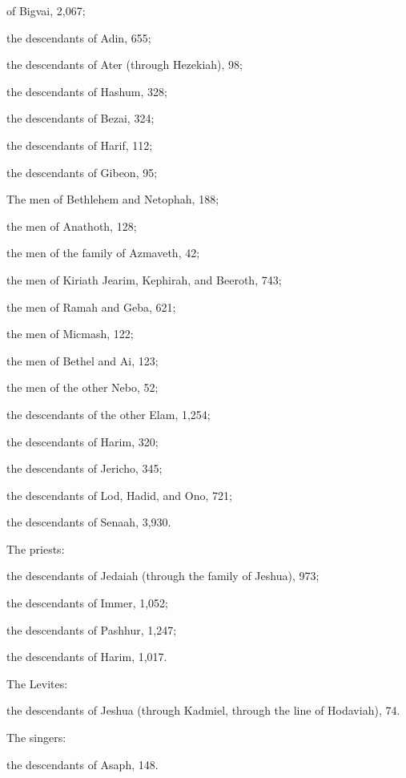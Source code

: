 {of Bigvai,
2,067;
\par }{\PP {}the descendants
of Adin,
655;
\par }{\PP {}the descendants
of Ater
(through Hezekiah), 98;
\par }{\PP {}the descendants
of Hashum,
328;
\par }{\PP {}the descendants
of Bezai,
324;
\par }{\PP {}the descendants
of Harif,
112;
\par }{\PP {}the descendants
of Gibeon,
95;
\par }{\PP {}The men
of Bethlehem
and Netophah,
188;
\par }{\PP {}the men
of Anathoth,
128;
\par }{\PP {}the men
of the family of Azmaveth,
42;
\par }{\PP {}the men
of Kiriath Jearim,
Kephirah,
and Beeroth,
743;
\par }{\PP {}the men
of Ramah
and Geba,
621;
\par }{\PP {}the men
of Micmash,
122;
\par }{\PP {}the men
of Bethel
and Ai,
123;
\par }{\PP {}the men
of the other
Nebo,
52;
\par }{\PP {}the descendants
of the other
Elam,
1,254;
\par }{\PP {}the descendants
of Harim,
320;
\par }{\PP {}the descendants
of Jericho,
345;
\par }{\PP {}the descendants
of Lod,
Hadid,
and Ono,
721;
\par }{\PP {}the descendants
of Senaah,
3,930.
\par }{\PP {}The priests:
\par }{\PP the descendants
of Jedaiah
(through the family
of Jeshua), 973;
\par }{\PP {}the descendants
of Immer,
1,052;
\par }{\PP {}the descendants
of Pashhur,
1,247;
\par }{\PP {}the descendants
of Harim,
1,017.
\par }{\PP {}The Levites:
\par }{\PP the descendants
of Jeshua
(through Kadmiel,
through the line of Hodaviah), 74.
\par }{\PP {}The singers:
\par }{\PP the descendants
of Asaph,
148.
}
